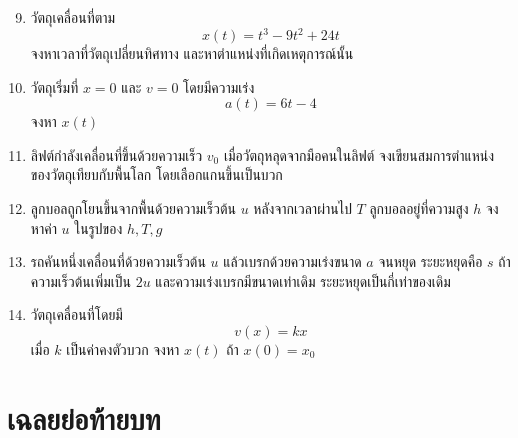 \documentclass[12pt,a4paper]{report}
\begin{document}
\begin{enumerate}
    \setcounter{enumi}{8}
    \item วัตถุเคลื่อนที่ตาม
    \[
    x(t)=t^3-9t^2+24t
    \]
    จงหาเวลาที่วัตถุเปลี่ยนทิศทาง และหาตำแหน่งที่เกิดเหตุการณ์นั้น
    \item วัตถุเริ่มที่ $x=0$ และ $v=0$ โดยมีความเร่ง
    \[
    a(t)=6t-4
    \]
    จงหา $x(t)$
    \item ลิฟต์กำลังเคลื่อนที่ขึ้นด้วยความเร็ว $v_0$ เมื่อวัตถุหลุดจากมือคนในลิฟต์ จงเขียนสมการตำแหน่งของวัตถุเทียบกับพื้นโลก โดยเลือกแกนขึ้นเป็นบวก
    \item ลูกบอลถูกโยนขึ้นจากพื้นด้วยความเร็วต้น $u$ หลังจากเวลาผ่านไป $T$ ลูกบอลอยู่ที่ความสูง $h$ จงหาค่า $u$ ในรูปของ $h,T,g$
    \item รถคันหนึ่งเคลื่อนที่ด้วยความเร็วต้น $u$ แล้วเบรกด้วยความเร่งขนาด $a$ จนหยุด ระยะหยุดคือ $s$ ถ้าความเร็วต้นเพิ่มเป็น $2u$ และความเร่งเบรกมีขนาดเท่าเดิม ระยะหยุดเป็นกี่เท่าของเดิม
    \item วัตถุเคลื่อนที่โดยมี
    \[
    v(x)=kx
    \]
    เมื่อ $k$ เป็นค่าคงตัวบวก จงหา $x(t)$ ถ้า $x(0)=x_0$
\end{enumerate}

\section{เฉลยย่อท้ายบท}
\end{document}
